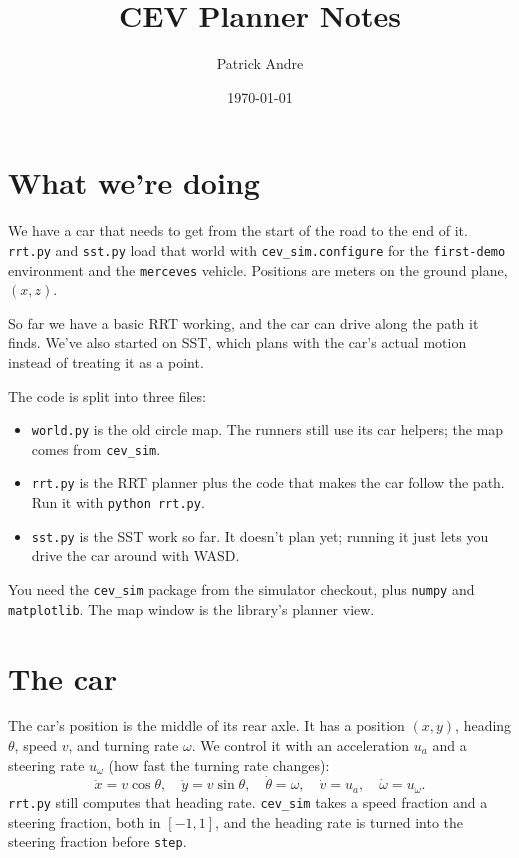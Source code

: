 \documentclass[11pt]{article}
\title{CEV Planner Notes}
\author{Patrick Andre}
\date{\today}
\newcommand{\code}[1]{\texttt{#1}}
\begin{document}
\maketitle

\section{What we're doing}

We have a car that needs to get from the start of the road to the end of it.
\code{rrt.py} and \code{sst.py} load that world with \code{cev\_sim.configure} for the
\code{first-demo} environment and the \code{merceves} vehicle. Positions are meters on the
ground plane, $(x, z)$.

So far we have a basic RRT working, and the car can drive along the path it finds. We've also started
on SST, which plans with the car's actual motion instead of treating it as a point.

The code is split into three files:
\begin{itemize}
  \item \code{world.py} is the old circle map. The runners still use its car helpers; the map comes
    from \code{cev\_sim}.
  \item \code{rrt.py} is the RRT planner plus the code that makes the car follow the path.
    Run it with \code{python rrt.py}.
  \item \code{sst.py} is the SST work so far. It doesn't plan yet; running it just lets you drive the car
    around with WASD.
\end{itemize}
You need the \code{cev\_sim} package from the simulator checkout, plus \code{numpy} and
\code{matplotlib}. The map window is the library's planner view.

\section{The car}

The car's position is the middle of its rear axle. It has a position $(x, y)$, heading $\theta$, speed
$v$, and turning rate $\omega$. We control it with an acceleration $u_a$ and a steering rate $u_\omega$
(how fast the turning rate changes):
\[
  \dot x = v\cos\theta, \quad \dot y = v\sin\theta, \quad \dot\theta = \omega, \quad
  \dot v = u_a, \quad \dot\omega = u_\omega.
\]
\code{rrt.py} still computes that heading rate. \code{cev\_sim} takes a speed fraction and a steering
fraction, both in $[-1, 1]$, and the heading rate is turned into the steering fraction before \code{step}.
\end{document}
